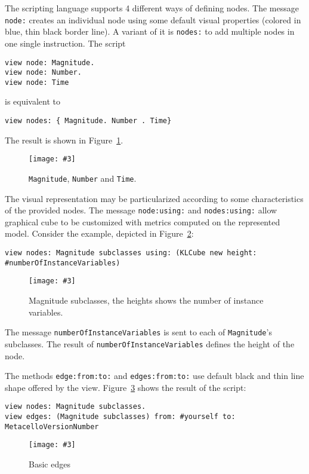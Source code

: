 \documentclass{sig-alternate}
\newcommand{\ct}{\lstinline[backgroundcolor=\color{white},basicstyle=\footnotesize\ttfamily]}
\newcommand{\rj}[1]{\nb{Ricardo}{green}{#1}}
\newcommand{\fig}[4]{
	\begin{figure}[#1]
		\centering
		\texttt{[image: \#3]}
		\caption{\label{fig:#3}#4}
	\end{figure}}
\newcommand{\figref}[1]{Figure~\ref{fig:#1}}
\begin{document}
The scripting language supports 4 different ways of defining nodes. 
The message \ct{node:} creates an individual node using some default visual properties (colored in blue, thin black border line). A variant of it is \ct{nodes:} to add multiple nodes in one single instruction. The script 

\begin{lstlisting}
view node: Magnitude.
view node: Number.
view node: Time    
\end{lstlisting}

is equivalent to

\begin{lstlisting}
view nodes: { Magnitude. Number . Time}
\end{lstlisting}

The result is shown in \figref{figure2.png}.

\fig{h!}{0.2}{figure2.png}{\ct{Magnitude}, \ct{Number} and \ct{Time}.}

The visual representation may be particularized according to some characteristics of the provided nodes. The message \ct{node:using:} and \ct{nodes:using:} allow graphical cube to be customized with metrics computed on the represented model. Consider the example, depicted in \figref{figure3.png}:

\begin{lstlisting}
view nodes: Magnitude subclasses using: (KLCube new height: #numberOfInstanceVariables)    
\end{lstlisting}

\fig{h}{0.3}{figure3.png}{Magnitude subclasses, the heights shows the number of instance variables.}

The message \ct{numberOfInstanceVariables} is sent to each of \ct{Magnitude}'s subclasses. The result of \texttt{number\-Of\-Instance\-Variables} defines the height of the node.

The methods \ct{edge:from:to:} and \ct{edges:from:to:} use default black and thin line shape offered by the view. \figref{figure4.png} shows the result of the script:

\begin{lstlisting}
view nodes: Magnitude subclasses.	
view edges: (Magnitude subclasses) from: #yourself to: MetacelloVersionNumber
\end{lstlisting}
\fig{h}{0.3}{figure4.png}{Basic edges}


 
\end{document}
